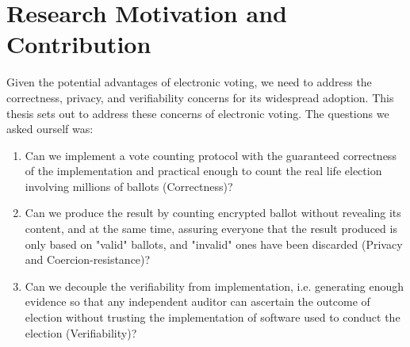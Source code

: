 \section{Research Motivation and Contribution}
Given the potential advantages of electronic voting,  we need to address
the correctness, privacy, and verifiability concerns for its widespread adoption. 
This thesis sets out to address these concerns of electronic voting. 
The questions we asked ourself was:
 \begin{enumerate} 
  \item Can we implement a vote counting protocol with the  
    guaranteed correctness of the implementation and practical enough
    to count the real life election involving millions of ballots (Correctness)?
  \item Can we produce the result by counting encrypted ballot without revealing 
  its content, and at the same time, 
  assuring everyone that the result produced is only based on "valid" ballots, 
  and "invalid" ones have been discarded  (Privacy and Coercion-resistance)?
 \item Can we decouple the verifiability from implementation, i.e. 
    generating enough evidence so that any independent auditor can 
    ascertain the outcome of election without trusting the implementation 
    of software used to conduct the election (Verifiability)?
  \end{enumerate}

